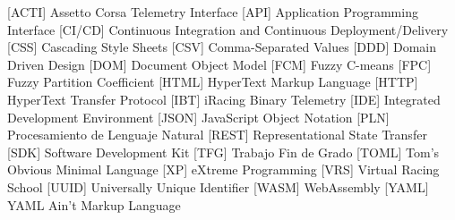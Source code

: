 \begin{acronym}[ICANN]
     [ACTI] {Assetto Corsa Telemetry Interface}
     [API] {Application Programming Interface}
     [CI/CD] {Continuous Integration and Continuous Deployment/Delivery}
     [CSS] {Cascading Style Sheets}
     [CSV] {Comma-Separated Values}
     [DDD] {Domain Driven Design}
     [DOM] {Document Object Model}
     [FCM] {Fuzzy C-means}
     [FPC] {Fuzzy Partition Coefficient}
     [HTML] {HyperText Markup Language}
     [HTTP] {HyperText Transfer Protocol}
       [IBT]   {iRacing Binary Telemetry}
       [IDE]   {Integrated Development Environment}
       [JSON]   {JavaScript Object Notation}
     [PLN] {Procesamiento de Lenguaje Natural}
     [REST] {Representational State Transfer}
       [SDK]   {Software Development Kit}
       [TFG]   {Trabajo Fin de Grado}
       [TOML]   {Tom's Obvious Minimal Language}
       [XP]   {eXtreme Programming}
       [VRS]   {Virtual Racing School}
       [UUID]   {Universally Unique Identifier}
       [WASM]   {WebAssembly}
       [YAML]   {YAML Ain't Markup Language}
\end{acronym}

